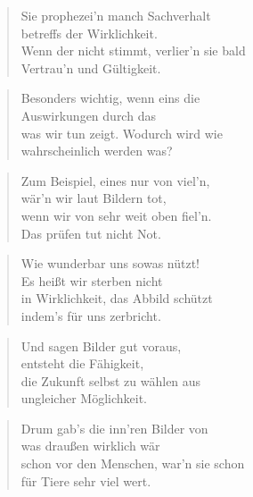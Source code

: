 \documentclass[10pt,a4paper]{article}
\begin{document}
\begin{paracol}{2}
\begin{verse}
Sie prophezei’n manch Sachverhalt \\
betreffs der Wirklichkeit. \\
Wenn der nicht stimmt, verlier’n sie bald \\
Vertrau’n und Gültigkeit. \\
\end{verse}

\begin{verse}
Besonders wichtig, wenn eins die \\
Auswirkungen durch das \\
was wir tun zeigt. Wodurch wird wie \\
wahrscheinlich werden was? \\
\end{verse}

\begin{verse}
Zum Beispiel, eines nur von viel’n, \\
wär’n wir laut Bildern tot, \\
wenn wir von sehr weit oben fiel’n. \\
Das prüfen tut nicht Not. \\
\end{verse}

\begin{verse}
Wie wunderbar uns sowas nützt! \\
Es heißt wir sterben nicht \\
in Wirklichkeit, das Abbild schützt \\
indem’s für uns zerbricht. \\
\end{verse}

\begin{verse}
Und sagen Bilder gut voraus, \\
entsteht die Fähigkeit, \\
die Zukunft selbst zu wählen aus \\
ungleicher Möglichkeit. \\
\end{verse}

\begin{verse}
Drum gab’s die inn’ren Bilder von \\
was draußen wirklich wär \\
schon vor den Menschen, war’n sie schon \\
für Tiere sehr viel wert. \\
\end{verse}


\end{paracol}
\end{document}

